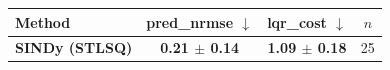 \begin{tabular}{lccc}
\toprule
Method & pred\_nrmse $\downarrow$ & lqr\_cost $\downarrow$ & $n$ \\
\midrule
\textbf{SINDy (STLSQ)} & \textbf{0.21 $\pm$ 0.14} & \textbf{1.09 $\pm$ 0.18} & 25 \\
\bottomrule
\end{tabular}
